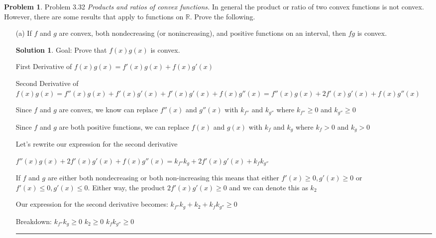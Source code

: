 \documentclass{article}
\theoremstyle{definition}
\newtheorem{problem}{Problem}
\def\fline{\rule{0.75\linewidth}{0.5pt}}
\newcommand{\finishline}{\begin{center}\fline\end{center}}
\newtheorem*{solution*}{Solution}
\newenvironment{solution}{\begin{solution*}}{{\finishline} \end{solution*}}
\begin{document}
\begin{problem} Problem 3.32
    \textit{Products and ratios of convex functions.} In general the product or ratio of two convex functions is not convex. However, there are some results that apply to functions on $\mathbb{R}$. Prove the following.

    \begin{itemize}
        \item[(a)] If $f$ and $g$ are convex, both nondecreasing (or nonincreasing), and positive functions on an interval, then $fg$ is convex.

        \begin{solution}
            Goal: Prove that $f(x) g(x)$ is convex. \newline 

            First Derivative of $f(x) g(x) = f'(x) g(x) + f(x) g'(x)$ \newline 

            Second Derivative of $f(x) g(x) = f''(x) g(x) + f'(x) g'(x) + f'(x) g'(x) + f(x) g''(x) = f''(x) g(x) + 2f'(x)g'(x) + f(x) g''(x)$

            Since $f$ and $g$ are convex, we know can replace $f''(x)$ and $g''(x)$ with $k_{f''}$ and $k_{g''}$ where $k_{f''} \geq 0$ and $k_{g''} \geq 0$

            Since $f$ and $g$ are both positive functions, we can replace $f(x)$ and $g(x)$ with $k_{f}$ and $k_{g}$ where $k_{f} > 0$ and $k_{g} > 0$

            Let's rewrite our expression for the second derivative \newline 

            $f''(x) g(x) + 2f'(x)g'(x) + f(x) g''(x) = k_{f''} k_{g} + 2f'(x)g'(x) + k_{f} k_{g''}$ \newline 

            If $f$ and $g$ are either both nondecreasing or both non-increasing this means that either $f'(x) \geq 0, g'(x) \geq 0$ or $f'(x) \leq 0, g'(x) \leq 0$. Either way, the product $2f'(x)g'(x) \geq 0$ and we can denote this as $k_2$

            Our expression for the second derivative becomes: \newline 
            $k_{f''} k_{g} + k_2 + k_{f} k_{g''} \geq 0$ \newline

            Breakdown: \newline 
            $k_{f''} k_{g} \geq 0$ \newline 
            $k_2 \geq 0$ \newline 
            $k_{f} k_{g''} \geq 0$ \newline 


\end{solution}
\end{itemize}
\end{problem}
\end{document}
